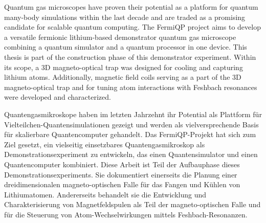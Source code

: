 Quantum gas microscopes have proven their potential as a platform for quantum many-body simulations within the last decade and are traded as a promising candidate for scalable quantum computing. The FermiQP project aims to develop a versatile fermionic lithium-based demonstrator quantum gas microscope combining a quantum simulator and a quantum processor in one device. This thesis is part of the construction phase of this demonstrator experiment. Within its scope, a 3D magneto-optical trap was designed for cooling and capturing lithium atoms. Additionally, magnetic field coils serving as a part of the 3D magneto-optical trap and for tuning atom interactions with Feshbach resonances were developed and characterized.
\vspace{2cm}

Quantengasmikroskope haben im letzten Jahrzehnt ihr Potential als Plattform für Vielteilchen-Quantensimulationen gezeigt und werden als vielversprechende Basis für skalierbare Quantencomputer gehandelt. Das FermiQP-Projekt hat sich zum Ziel gesetzt, ein vielseitig einsetzbares Quantengasmikroskop als Demonstrationsexperiment zu entwickeln, das einen Quantensimulator und einen Quantencomputer kombiniert. Diese Arbeit ist Teil der Aufbauphase dieses Demonstrationsexperiments. Sie dokumentiert einerseits die Planung einer dreidimensionalen magneto-optischen Falle für das Fangen und Kühlen von Lithiumatomen. Andererseits behandelt sie die Entwicklung und Charakterisierung von Magnetfeldspulen als Teil der magneto-optischen Falle und für die Steuerung von Atom-Wechselwirkungen mittels Feshbach-Resonanzen.
